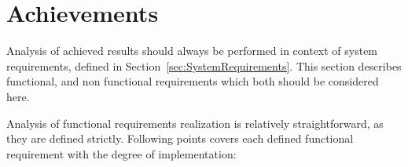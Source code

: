 %


\section{Achievements}
\label{sec:achievements}

Analysis of achieved results should always be performed in context of system requirements, defined in Section~\ref{sec:SystemRequirements}. This section describes functional, and non functional requirements which both should be considered here. 

Analysis of functional requirements realization is relatively straightforward, as they are defined strictly. 
Following points covers each defined functional requirement with the degree of implementation:


